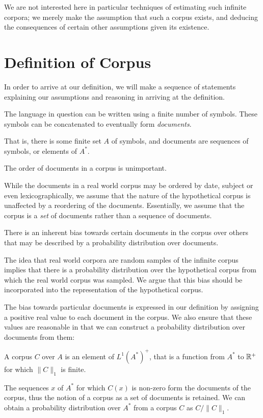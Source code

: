 \documentclass[11pt]{report}
\begin{document}
We are not interested here in particular techniques of estimating such infinite corpora; we merely make the assumption that such a corpus exists, and deducing the consequences of certain other assumptions given its existence.


\section{Definition of Corpus}


In order to arrive at our definition, we will make a sequence of statements explaining our assumptions and reasoning in arriving at the definition.


\begin{assumption}The language in question can be written using a finite number of symbols. These symbols can be concatenated to eventually form \emph{documents}.\end{assumption}\noindent
That is, there is some finite set $A$ of symbols, and documents are sequences of symbols, or elements of $A^*$.

\begin{assumption} The order of documents in a corpus is unimportant.\end{assumption} \noindent
While the documents in a real world corpus may be ordered by date, subject or even lexicographically, we assume that the nature of the hypothetical corpus is unaffected by a reordering of the documents. Essentially, we assume that the corpus is a \emph{set} of documents rather than a sequence of documents.



\begin{assumption}There is an inherent bias towards certain documents in the corpus over others that may be described by a probability distribution over documents.\end{assumption} \noindent
The idea that real world corpora are random samples of the infinite corpus implies that there is a probability distribution over the hypothetical corpus from which the real world corpus was sampled. We argue that this bias should be incorporated into the representation of the hypothetical corpus.

The bias towards particular documents is expressed in our definition by assigning a positive real value to each document in the corpus. We also ensure that these values are reasonable in that we can construct a probability distribution over documents from them:
\begin{defn}[Corpus]
A corpus $C$ over $A$ is an element of $L^1(A^*)^+$, that is a function from $A^*$ to $\mathbb{R}^+$ for which $\|C\|_1$ is finite. 
\end{defn}\noindent
The sequences $x$ of $A^*$ for which $C(x)$ is non-zero form the documents of the corpus, thus the notion of a corpus as a set of documents is retained. We can obtain a probability distribution over $A^*$ from a corpus $C$ as $C/\|C\|_1$.
\end{document}
